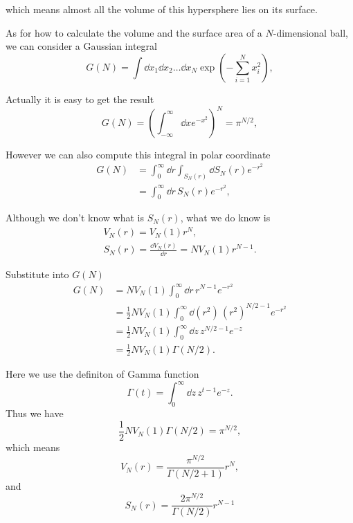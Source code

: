 \documentclass[10pt]{article}
\begin{document}
	which means almost all the volume of this hypersphere lies on its surface.

	As for how to calculate the volume and the surface area of a $N$-dimensional ball, we can consider a Gaussian integral
	\begin{equation}
		G(N) = \int \dd x_1 \dd x_2 \dots \dd x_N \exp\left(-\sum_{i=1}^{N} x_i^2\right),
	\end{equation}

	Actually it is easy to get the result
	\begin{equation}
		G(N) = \left(\int_{-\infty}^{\infty} \dd x e^{-x^2}\right)^N = \pi^{N/2},
	\end{equation}

	However we can also compute this integral in polar coordinate
	\begin{align*}
	G(N) &= \int_0^{\infty} \dd r \int_{S_N(r)} \dd S_N(r) e^{-r^2} \\
	&= \int_0^{\infty} \dd r \, S_N(r) e^{-r^2},
	\end{align*}

	Although we don't know what is $S_N(r)$, what we do know is
	\begin{gather}
		V_N(r) = V_N(1)r^N, \\
		S_N(r) = \frac{\dd V_N(r)}{\dd r} = NV_N(1)r^{N-1}.
	\end{gather}

	Substitute into $G(N)$
	\begin{align*}
		G(N) &= NV_N(1) \int_0^{\infty} \dd r \, r^{N-1} e^{-r^2} \\
		&= \frac{1}{2}NV_N(1) \int_0^{\infty} \dd (r^2) \, (r^2)^{N/2-1} e^{-r^2} \\
		&= \frac{1}{2}NV_N(1) \int_0^{\infty} \dd z \, z^{N/2-1} e^{-z} \\
		&= \frac{1}{2}NV_N(1) \Gamma(N/2).
	\end{align*}

	Here we use the definiton of Gamma function
	\begin{equation}
		\Gamma(t) = \int_0^{\infty} \dd z \, z^{t-1}e^{-z}.
	\end{equation}
	Thus we have
	\begin{equation}
		\frac{1}{2}NV_N(1) \Gamma(N/2) = \pi^{N/2},
	\end{equation}
	which means
	\begin{equation}
		V_N(r) = \frac{\pi^{N/2}}{\Gamma(N/2 +1)}r^N,
	\end{equation}
	and
	\begin{equation}
		S_N(r) = \frac{2\pi^{N/2}}{\Gamma(N/2)}r^{N-1}
	\end{equation}
\end{document}
